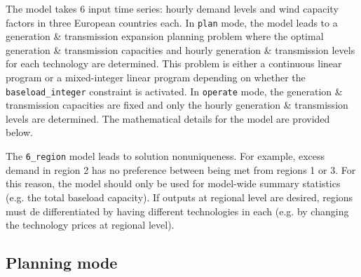 \documentclass[preprint]{elsarticle}
\begin{document}
The model takes 6 input time series: hourly demand levels and wind capacity factors in three European countries each. In \texttt{plan} mode, the model leads to a generation \& transmission expansion planning problem where the optimal generation \& transmission capacities and hourly generation \& transmission levels for each technology are determined. This problem is either a continuous linear program or a mixed-integer linear program depending on whether the \texttt{baseload\_integer} constraint is activated. In \texttt{operate} mode, the generation \& transmission capacities are fixed and only the hourly generation \& transmission levels are determined. The mathematical details for the model are provided below.

The \texttt{6\_region} model leads to solution nonuniqueness. For example, excess demand in region 2 has no preference between being met from regions 1 or 3. For this reason, the model should only be used for model-wide summary statistics (e.g. the total baseload capacity). If outputs at regional level are desired, regions must de differentiated by having different technologies in each (e.g. by changing the technology prices at regional level). 




\subsection{Planning mode}
\label{sec:appendix:optimisation:model_3}
\end{document}
